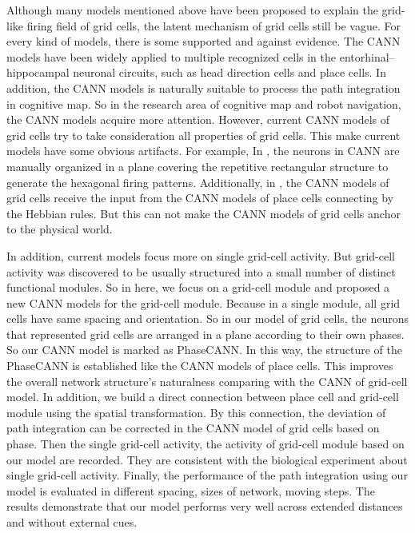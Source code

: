 \documentclass[preprint,12pt]{elsarticle}
\begin{document}
Although many models mentioned above have been proposed to explain the grid-like firing field of grid cells, the latent mechanism of grid cells still be vague. For every kind of models, there is some supported and against evidence. The CANN models have been widely applied to multiple recognized cells in the entorhinal–hippocampal neuronal circuits, such as head direction cells and place cells. In addition, the CANN models is naturally suitable to process the path integration in cognitive map. So in the research area of cognitive map and robot navigation, the CANN models acquire more attention. However, current CANN models of grid cells try to take consideration all properties of grid cells. This make current models have some obvious artifacts. For example, In \cite{Guanella2007}, the neurons in CANN are manually organized in a plane covering the repetitive rectangular structure to generate the hexagonal firing patterns. Additionally, in \cite{Guanella2007}, the CANN models of grid cells receive the input from the CANN models of place cells connecting by the Hebbian rules. But this can not make the CANN models of grid cells anchor to the physical world\cite{DAlbis2017}.

In addition, current models focus more on single grid-cell activity. But grid-cell activity was discovered to be usually structured into a small number of distinct functional modules. So in here, we focus on a grid-cell module and proposed a new CANN models for the grid-cell module. Because in a single module, all grid cells have same spacing and orientation\cite{Stensola2012}. So in our model of grid cells, the neurons that represented grid cells are arranged in a plane according to their own phases. So our CANN model is marked as PhaseCANN. In this way, the structure of the PhaseCANN is established like the CANN models of place cells\cite{McNaughton2006}. This improves the overall network structure's naturalness comparing with the CANN of grid-cell model\cite{Guanella2007}. In addition, we build a direct connection between place cell and grid-cell module using the spatial transformation. By this connection, the deviation of path integration can be corrected in the CANN model of grid cells based on phase. Then the single grid-cell activity, the activity of grid-cell module based on our model are recorded. They are consistent with the biological experiment about single grid-cell activity\cite{Hafting2005}. Finally, the performance of the path integration using our model is evaluated in different spacing, sizes of network, moving steps. The results demonstrate that our model performs very well across extended distances and without external cues.
\end{document}
